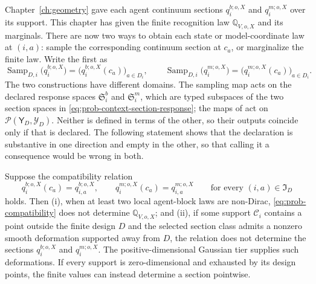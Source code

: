 Chapter~\ref{ch:geometry} gave each agent continuum sections $q_i^{b;o,X}$ and $q_i^{m;o,X}$ over its support. This chapter has given the finite recognition law $\mathbb Q_{V,o,X}$ and its marginals. There are now two ways to obtain each state or model-coordinate law at $(i,a)$: sample the corresponding continuum section at $c_a$, or marginalize the finite law. Write the first as
\begin{equation}
\operatorname{Samp}_{D,i}\bigl(q_i^{b;o,X}\bigr)=\bigl(q_i^{b;o,X}(c_a)\bigr)_{a\in D_i},
\qquad
\operatorname{Samp}_{D,i}\bigl(q_i^{m;o,X}\bigr)=\bigl(q_i^{m;o,X}(c_a)\bigr)_{a\in D_i}.
\label{eq:prob-sampling-map}
\end{equation}
The two constructions have different domains. The sampling map acts on the declared response spaces
\(\mathfrak S_i^b\) and \(\mathfrak S_i^m\), which are typed subspaces of the two section spaces in
\eqref{eq:prob-context-section-response}; the maps of  act on
\(\mathcal P(\mathsf Y_D,\mathscr Y_D)\). Neither is defined in terms of the other, so their outputs coincide only if that is declared. The following statement shows that the declaration is substantive in one direction and empty in the other, so that calling it a consequence would be wrong in both.

\medskip
{}
Suppose the compatibility relation
\begin{equation}
q_i^{b;o,X}(c_a)=q_{i,a}^{b;o,X},
\qquad
q_i^{m;o,X}(c_a)=q_{i,a}^{m;o,X}
\qquad\text{for every }(i,a)\in\mathfrak I_D
\label{eq:prob-compatibility}
\end{equation}
holds. Then (i), when at least two local agent-block laws are non-Dirac, \eqref{eq:prob-compatibility} does not determine $\mathbb Q_{V,o,X}$; and (ii), if some support \(\mathcal C_i\) contains a point outside the finite design \(D\) and the selected section class admits a nonzero smooth deformation supported away from \(D\), the relation does not determine the sections $q_i^{b;o,X}$ and $q_i^{m;o,X}$. The positive-dimensional Gaussian tier supplies such deformations. If every support is zero-dimensional and exhausted by its design points, the finite values can instead determine a section pointwise. 
\medskip

